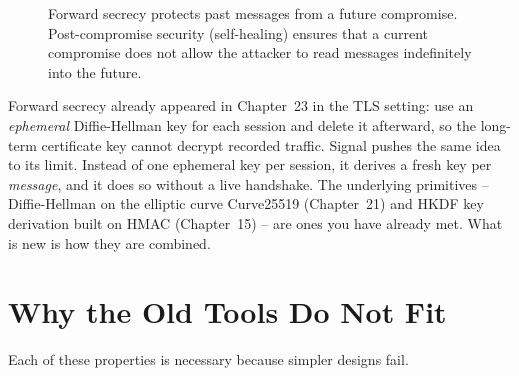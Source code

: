 \begin{figure}[htbp]
\centering
{}
\caption{Forward secrecy protects past messages from a future compromise. Post-compromise security (self-healing) ensures that a current compromise does not allow the attacker to read messages indefinitely into the future.}
\label{fig:secrecy-timeline}
\end{figure}

\begin{connectionbox}
Forward secrecy already appeared in Chapter~23 in the TLS setting: use an \emph{ephemeral} Diffie-Hellman key for each session and delete it afterward, so the long-term certificate key cannot decrypt recorded traffic. Signal pushes the same idea to its limit. Instead of one ephemeral key per session, it derives a fresh key per \emph{message}, and it does so without a live handshake. The underlying primitives -- Diffie-Hellman on the elliptic curve Curve25519 (Chapter~21) and HKDF key derivation built on HMAC (Chapter~15) -- are ones you have already met. What is new is how they are combined.
\end{connectionbox}

\section{Why the Old Tools Do Not Fit}
\label{ch27:why-old-fails}

Each of these properties is necessary because simpler designs fail.

